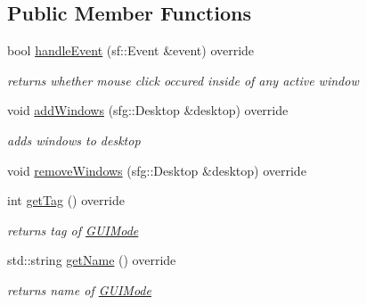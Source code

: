 \subsection*{Public Member Functions}
\begin{DoxyCompactItemize}
\item 
\hypertarget{classGUIModeManagement_a7af5f6b7024c11a06379a241d70f6bfc}{bool \hyperlink{classGUIModeManagement_a7af5f6b7024c11a06379a241d70f6bfc}{handle\-Event} (sf\-::\-Event \&event) override}\label{classGUIModeManagement_a7af5f6b7024c11a06379a241d70f6bfc}

\begin{DoxyCompactList}\small\item\em returns whether mouse click occured inside of any active window \end{DoxyCompactList}\item 
\hypertarget{classGUIModeManagement_a4b85e7c62287b1e2f7b9ebf53cefc72e}{void \hyperlink{classGUIModeManagement_a4b85e7c62287b1e2f7b9ebf53cefc72e}{add\-Windows} (sfg\-::\-Desktop \&desktop) override}\label{classGUIModeManagement_a4b85e7c62287b1e2f7b9ebf53cefc72e}

\begin{DoxyCompactList}\small\item\em adds windows to desktop \end{DoxyCompactList}\item 
void \hyperlink{classGUIModeManagement_a1c1602738b2628a7f31d7ccd0201a99a}{remove\-Windows} (sfg\-::\-Desktop \&desktop) override
\item 
\hypertarget{classGUIModeManagement_a6eb3d7e84c3a3b522b4546b3e340f5b8}{int \hyperlink{classGUIModeManagement_a6eb3d7e84c3a3b522b4546b3e340f5b8}{get\-Tag} () override}\label{classGUIModeManagement_a6eb3d7e84c3a3b522b4546b3e340f5b8}

\begin{DoxyCompactList}\small\item\em returns tag of \hyperlink{classGUIMode}{G\-U\-I\-Mode} \end{DoxyCompactList}\item 
\hypertarget{classGUIModeManagement_ae00eac44914029a5a57c44818c5ee7ec}{std\-::string \hyperlink{classGUIModeManagement_ae00eac44914029a5a57c44818c5ee7ec}{get\-Name} () override}\label{classGUIModeManagement_ae00eac44914029a5a57c44818c5ee7ec}

\begin{DoxyCompactList}\small\item\em returns name of \hyperlink{classGUIMode}{G\-U\-I\-Mode} \end{DoxyCompactList}\end{DoxyCompactItemize}


